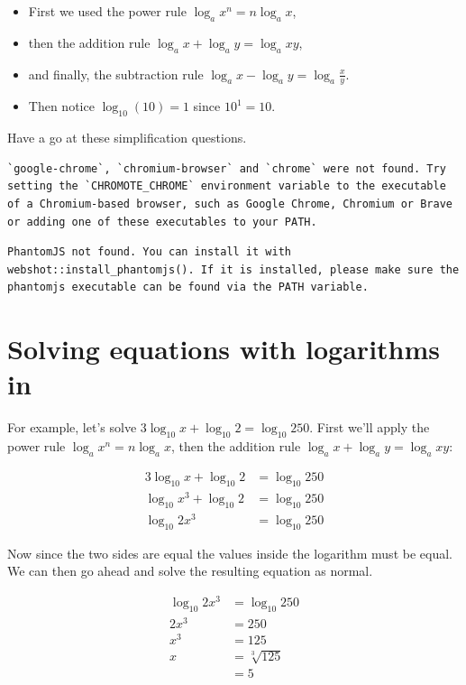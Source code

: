 \documentclass[
  a4paper,
]{scrbook}
\providecommand{\tightlist}{%
  \setlength{\itemsep}{0pt}\setlength{\parskip}{0pt}}
\begin{document}
\begin{itemize}
\tightlist
\item
  First we used the power rule \(\log_{a} x^n = n\log_{a} x\),
\item
  then the addition rule \(\log_{a} x + \log_{a} y = \log_{a} xy\),
\item
  and finally, the subtraction rule
  \(\log_{a} x - \log_{a} y = \log_{a}{\frac{x}{y}}\).
\item
  Then notice \(\log_{10} (10)= 1\) since \(10^1=10\).
\end{itemize}

Have a go at these simplification questions.

\begin{verbatim}
`google-chrome`, `chromium-browser` and `chrome` were not found. Try setting the `CHROMOTE_CHROME` environment variable to the executable of a Chromium-based browser, such as Google Chrome, Chromium or Brave or adding one of these executables to your PATH.
\end{verbatim}

\begin{verbatim}
PhantomJS not found. You can install it with webshot::install_phantomjs(). If it is installed, please make sure the phantomjs executable can be found via the PATH variable.
\end{verbatim}

\section{Solving equations with logarithms
in}\label{solving-equations-with-logarithms-in}

For example, let's solve \(3\log_{10} x + \log_{10} 2 = \log_{10} 250\).
First we'll apply the power rule \(\log_{a} x^n = n\log_{a} x\), then
the addition rule \(\log_{a} x + \log_{a} y = \log_{a} xy\):

\[
\begin{aligned}
3\log_{10} x + \log_{10} 2 &= \log_{10} 250 \\
\log_{10} x^3 + \log_{10} 2 &= \log_{10} 250 \\
\log_{10} 2x^3 &= \log_{10} 250
\end{aligned}
\]

Now since the two sides are equal the values inside the logarithm must
be equal. We can then go ahead and solve the resulting equation as
normal.

\[
\begin{aligned}
\log_{10} 2x^3 &= \log_{10} 250 \\
2x^3 &= 250 \\
x^3 &= 125 \\
x &= \sqrt[3]{125} \\
 &= 5
\end{aligned}
\]
\end{document}
